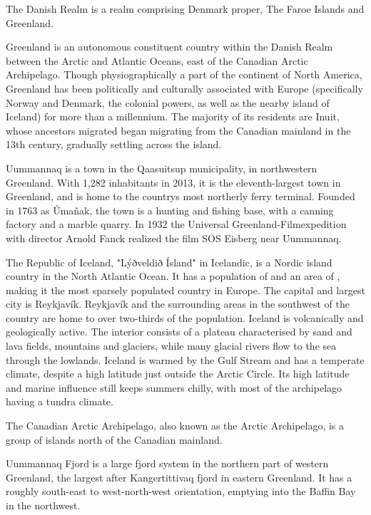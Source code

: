 \documentclass{article} \usepackage{iclr2019_conference,times}
\begin{document}
The Danish Realm is a realm comprising Denmark proper, The Faroe Islands and Greenland. 

Greenland  is an autonomous constituent country within the Danish Realm between the Arctic and Atlantic Oceans, east of the Canadian Arctic Archipelago. Though physiographically a part of the continent of North America, Greenland has been politically and culturally associated with Europe (specifically Norway and Denmark, the colonial powers, as well as the nearby island of Iceland) for more than a millennium. The majority of its residents are Inuit, whose ancestors migrated began migrating from the Canadian mainland in the 13th century, gradually settling across the island.

Uummannaq is a town in the Qaasuitsup municipality, in northwestern Greenland. With 1,282 inhabitants in 2013, it is the eleventh-largest town in Greenland, and is home to the countrys most northerly ferry terminal. Founded in 1763 as Ûmañak, the town is a hunting and fishing base, with a canning factory and a marble quarry. In 1932 the Universal Greenland-Filmexpedition with director Arnold Fanck realized the film SOS Eisberg near Uummannaq.

The Republic of Iceland, "Lýðveldið Ísland" in Icelandic, is a Nordic island country in the North Atlantic Ocean. It has a population of and an area of , making it the most sparsely populated country in Europe. The capital and largest city is Reykjavík. Reykjavík and the surrounding areas in the southwest of the country are home to over two-thirds of the population. Iceland is volcanically and geologically active. The interior consists of a plateau characterised by sand and lava fields, mountains and glaciers, while many glacial rivers flow to the sea through the lowlands. Iceland is warmed by the Gulf Stream and has a temperate climate, despite a high latitude just outside the Arctic Circle. Its high latitude and marine influence still keeps summers chilly, with most of the archipelago having a tundra climate.

The Canadian Arctic Archipelago, also known as the Arctic Archipelago, is a group of islands north of the Canadian mainland.

Uummannaq Fjord is a large fjord system in the northern part of western Greenland, the largest after Kangertittivaq fjord in eastern Greenland. It has a roughly south-east to west-north-west orientation, emptying into the Baffin Bay in the northwest.
\end{document}
